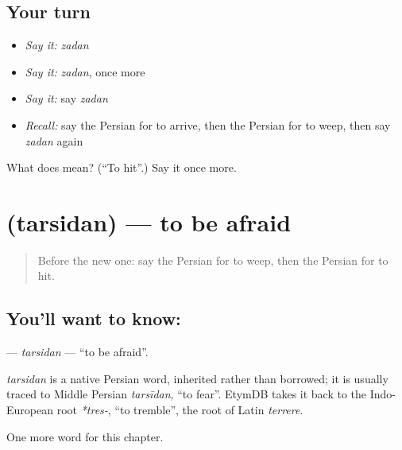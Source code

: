 \subsection*{Your turn}
\begin{itemize}
\raggedright
  \item \emph{Say it:} \emph{zadan}
  \item \emph{Say it:} \emph{zadan}, once more
  \item \emph{Say it:} say \emph{zadan}
  \item \emph{Recall:} say the Persian for to arrive, then the Persian for to weep, then say \emph{zadan} again
\end{itemize}

\begin{tcolorbox}[breakable,colback=teal!4,colframe=teal!35!black,title={Before you move on}]
What does  mean? (\textquotedblleft{}To hit\textquotedblright{}.) Say it once more.
\end{tcolorbox}
\section[\texorpdfstring{\fa{ترسیدن} (tarsidan)}{ترسیدن (tarsidan)}]{ (tarsidan) — to be afraid}

\label{lesson:FA-C134-tarsidan}



\begin{quote}
Before the new one: say the Persian for to weep, then the Persian for to hit.
\end{quote}

\subsection*{You'll want to know: }
\textbf{} — \emph{tarsidan} — \textquotedblleft{}to be afraid\textquotedblright{}.

\begin{cousinweb}
\emph{tarsidan} is a native Persian word, inherited rather than borrowed; it is usually traced to Middle Persian \emph{tarsīdan}, \textquotedblleft{}to fear\textquotedblright{}. EtymDB takes it back to the Indo-European root \emph{*tres-}, \textquotedblleft{}to tremble\textquotedblright{}, the root of Latin \emph{terrere}.
\end{cousinweb}

\begin{grammarlens}[title={What you've built}]
One more word for this chapter.
\end{grammarlens}

